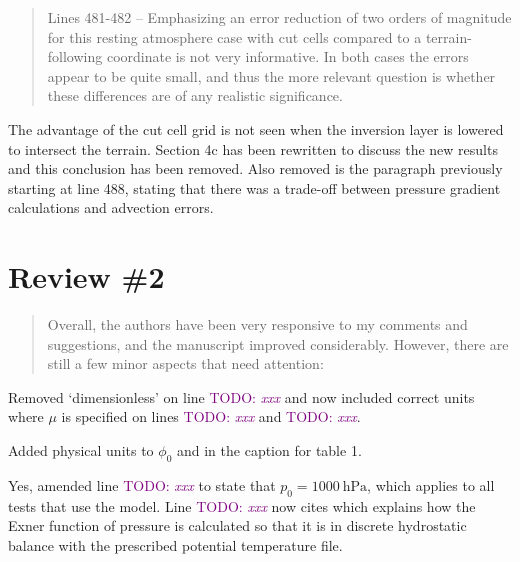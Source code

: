 \documentclass{article}
\newcommand{\TODO}[1]{\textcolor{purple}{TODO: \emph{#1}}}
\begin{document}
\begin{quotation}
 Lines 481-482 -- Emphasizing an error reduction of two orders of magnitude for this 
 resting atmosphere case with cut cells compared to a terrain-following coordinate is 
 not very informative. In both cases the errors appear to be quite small, and thus the 
 more relevant question is whether these differences are of any realistic significance. 
\end{quotation}
The advantage of the cut cell grid is not seen when the inversion layer is lowered to intersect the terrain.  Section 4c has been rewritten to discuss the new results and this conclusion has been removed.  Also removed is the paragraph previously starting at line 488, stating that there was a trade-off between pressure gradient calculations and advection errors.


\section*{Review \#2}
\begin{quotation}
Overall, the authors have been very responsive to my comments and suggestions, and the manuscript improved considerably.
However, there are still a few minor aspects that need attention:
\begin{comment}
\item From equation (7a) it is clear that the symbol mu needs a physical unit which is 1/s. The statement in line 195
that mu is dimensionless is therefore wrong and needs to be corrected.
\end{comment}
\end{quotation}
Removed `dimensionless' on line \TODO{xxx} and now included correct units where $\mu$ is specified on lines \TODO{xxx} and \TODO{xxx}.

\begin{quotation}
	\begin{comment}
	\item Line 241: $\phi$ is defined as the tracer density. Therefore, the definition of $\phi_0$ needs the physical unit \si{\kilogram\per\meter\cubed}
	\end{comment}
\end{quotation}
Added physical units to $\phi_0$ and in the caption for table 1.

\begin{quotation}
	\begin{comment}
	\item Page 18, test c): The initial conditions look incomplete. Please provide information about the initial density or pressure initialization. Do you assume that the pressure at z=0 m is 1000 hPa?
	\end{comment}
\end{quotation}
Yes, amended line \TODO{xxx} to state that $p_0 = \SI{1000}{\hecto\pascal}$, which applies to all tests that use the model.  Line \TODO{xxx} now cites \citet{weller-shahrokhi2014} which explains how the Exner function of pressure is calculated so that it is in discrete hydrostatic balance with the prescribed potential temperature file.
\end{document}

